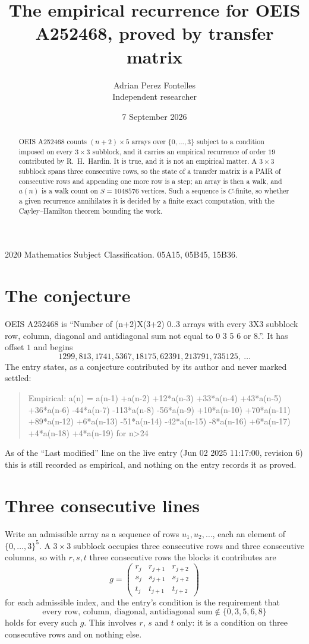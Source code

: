 \documentclass[11pt,a4paper]{article}
\title{The empirical recurrence for OEIS A252468, proved by transfer matrix}
\author{Adrian Perez Fontelles\\ \small Independent researcher}
\date{7 September 2026}
\theoremstyle{plain}
\theoremstyle{definition}
\begin{document}
\maketitle

\begin{abstract}
OEIS A252468 counts $(n+2)\times5$ arrays over $\{0,\dots,3\}$ subject to a condition imposed on
every $3\times3$ subblock, and it carries an empirical recurrence of order $19$
contributed by R.~H.~Hardin. It is true, and it is not an empirical matter. A $3\times3$
subblock spans three consecutive rows, so the state of a transfer matrix is a PAIR of
consecutive rows and appending one more row is a step; an array is then a walk, and
$a(n)$ is a walk count on $S=1048576$ vertices. Such a sequence is $C$-finite, so whether a given
recurrence annihilates it is decided by a finite exact computation, with the Cayley--Hamilton
theorem bounding the work.
\end{abstract}

\noindent\small 2020 Mathematics Subject Classification. 05A15, 05B45, 15B36.\normalsize

\section{The conjecture}

OEIS A252468 is ``Number of (n+2)X(3+2) 0..3 arrays with every 3X3 subblock row, column, diagonal and antidiagonal sum not equal to 0 3 5 6 or 8.''. It has offset $1$ and begins
\[
1299, 813, 1741, 5367, 18175, 62391, 213791, 735125,\ \dots
\]
The entry states, as a conjecture contributed by its author and never marked settled:
\begin{quote}
Empirical: a(n) = a(n-1) +a(n-2) +12*a(n-3) +33*a(n-4) +43*a(n-5) +36*a(n-6) -44*a(n-7) -113*a(n-8) -56*a(n-9) +10*a(n-10) +70*a(n-11) +89*a(n-12) +6*a(n-13) -51*a(n-14) -42*a(n-15) -8*a(n-16) +6*a(n-17) +4*a(n-18) +4*a(n-19) for n>24
\end{quote}
As of the ``Last modified'' line on the live entry (Jun 02 2025 11:17:00, revision 6) this is still
recorded as empirical, and nothing on the entry records it as proved.

\section{Three consecutive lines}

Write an admissible array as a sequence of rows $u_1,u_2,\dots$, each an element of
$\{0,\dots,3\}^{5}$. A $3\times3$ subblock occupies three consecutive rows and
three consecutive columns, so with $r,s,t$ three consecutive rows the blocks it
contributes are
\[
g=\begin{pmatrix}r_j&r_{j+1}&r_{j+2}\\ s_j&s_{j+1}&s_{j+2}\\ t_j&t_{j+1}&t_{j+2}\end{pmatrix}
\]
for each admissible index, and the entry's condition is the requirement that
\[
\text{every row, column, diagonal, antidiagonal sum} \notin \{0,3,5,6,8\}
\]
holds for every such $g$. This involves $r$, $s$ and $t$ only: it is a condition on
three consecutive rows and on nothing else.
\end{document}
